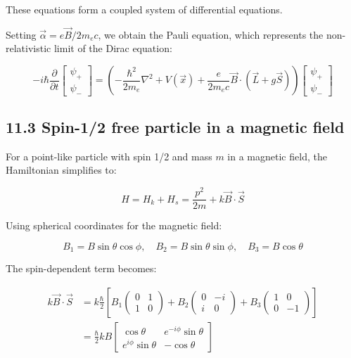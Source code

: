 \documentclass[italian]{HKNdocument}
\begin{document}
These equations form a coupled system of differential equations.

Setting $\vec{\alpha}=e \vec{B} / 2 m_{e} c$, we obtain the Pauli equation, which represents the non-relativistic limit of the Dirac equation:

\[
-i \hbar \frac{\partial}{\partial t}\left[\begin{array}{l}
\psi_{+}  \tag{11.26}\\
\psi_{-}
\end{array}\right]=\left(-\frac{\hbar^{2}}{2 m_{e}} \nabla^{2}+V(\vec{x})+\frac{e}{2 m_{e} c} \vec{B} \cdot(\vec{L}+g \vec{S})\right)\left[\begin{array}{l}
\psi_{+} \\
\psi_{-}
\end{array}\right]
\]

\subsection*{11.3 Spin-1/2 free particle in a magnetic field}
For a point-like particle with spin 1/2 and mass $m$ in a magnetic field, the Hamiltonian simplifies to:

\begin{equation*}
H=H_{k}+H_{s}=\frac{p^{2}}{2 m}+k \vec{B} \cdot \vec{S} \tag{11.27}
\end{equation*}

Using spherical coordinates for the magnetic field:

\begin{equation*}
B_{1}=B \sin \theta \cos \phi, \quad B_{2}=B \sin \theta \sin \phi, \quad B_{3}=B \cos \theta \tag{11.28}
\end{equation*}

The spin-dependent term becomes:

\begin{align*}
k \vec{B} \cdot \vec{S} &= k \frac{\hbar}{2}\left[B_{1}\left(\begin{array}{ll}
0 & 1 \\
1 & 0
\end{array}\right)+B_{2}\left(\begin{array}{cc}
0 & -i \\
i & 0
\end{array}\right)+B_{3}\left(\begin{array}{cc}
1 & 0 \\
0 & -1
\end{array}\right)\right] \\
&= \frac{\hbar}{2} k B\left[\begin{array}{cc}
\cos \theta & e^{-i \phi} \sin \theta \\
e^{i \phi} \sin \theta & -\cos \theta
\end{array}\right] \tag{11.29}
\end{align*}
\end{document}
